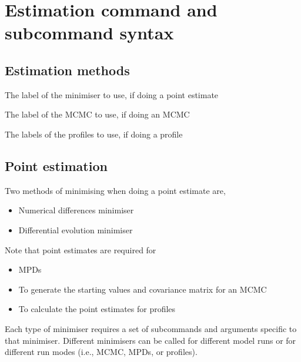 \section{Estimation command and subcommand syntax\label{sec:estimation-syntax}}

\subsection{Estimation methods}


 {The label of the minimiser to use, if doing a point estimate}

 {The label of the MCMC to use, if doing an MCMC}

 {The labels of the profiles to use, if doing a profile}


\subsection{Point estimation}

Two methods of minimising when doing a point estimate are,

\begin{itemize}
	\item Numerical differences minimiser
  \item Differential evolution minimiser
\end{itemize}

Note that point estimates are required for

\begin{itemize}
  \item MPDs
  \item To generate the starting values and covariance matrix for an MCMC
  \item To calculate the point estimates for profiles
\end{itemize}

Each type of minimiser requires a set of subcommands and arguments specific to that minimiser. Different minimisers can be called for different model runs or for different run modes (i.e., MCMC, MPDs, or profiles).

